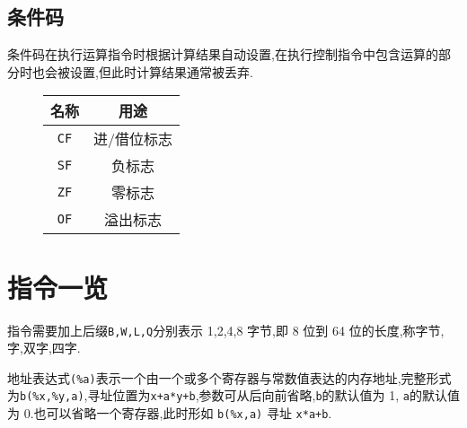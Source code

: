         \subsection{条件码}
        条件码在执行运算指令时根据计算结果自动设置,在执行控制指令中包含运算的部分时也会被设置,但此时计算结果通常被丢弃.
        \begin{figure}[htbp]
            \centering
            \begin{tabular}{c||c}
                名称 & 用途\\\hline\hline
                \texttt{CF} & 进/借位标志\\\hline
                \texttt{SF} & 负标志\\\hline
                \texttt{ZF} & 零标志\\\hline
                \texttt{OF} & 溢出标志\\
            \end{tabular}
        \end{figure}
    \section{指令一览}
        指令需要加上后缀\texttt{B,W,L,Q}分别表示 1,2,4,8 字节,即 8 位到 64 位的长度,称字节,字,双字,四字.

        地址表达式\texttt{(\%a)}表示一个由一个或多个寄存器与常数值表达的内存地址,完整形式为\texttt{b(\%x,\%y,a)},寻址位置为\texttt{x+a*y+b},参数可从后向前省略,\texttt{b}的默认值为 1, \texttt{a}的默认值为 0.也可以省略一个寄存器,此时形如 \texttt{b(\%x,a)} 寻址 \texttt{x*a+b}.
